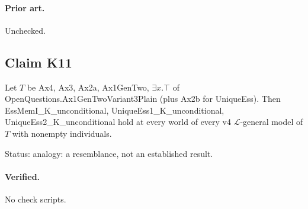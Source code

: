 \documentclass{article}
\begin{document}
\paragraph{Prior art.} Unchecked.

\subsection*{Claim K11}

Let $T$ be Ax4, Ax3, Ax2a, Ax1GenTwo, $\exists x.\top$ of OpenQuestions.Ax1GenTwoVariant3Plain (plus Ax2b for UniqueEss). Then EssMemI\_K\_unconditional, UniqueEss1\_K\_unconditional, UniqueEss2\_K\_unconditional hold at every world of every v4 $\mathcal L$-general model of $T$ with nonempty individuals.

Status: analogy: a resemblance, not an established result.

\paragraph{Verified.}
No check scripts.
\end{document}

